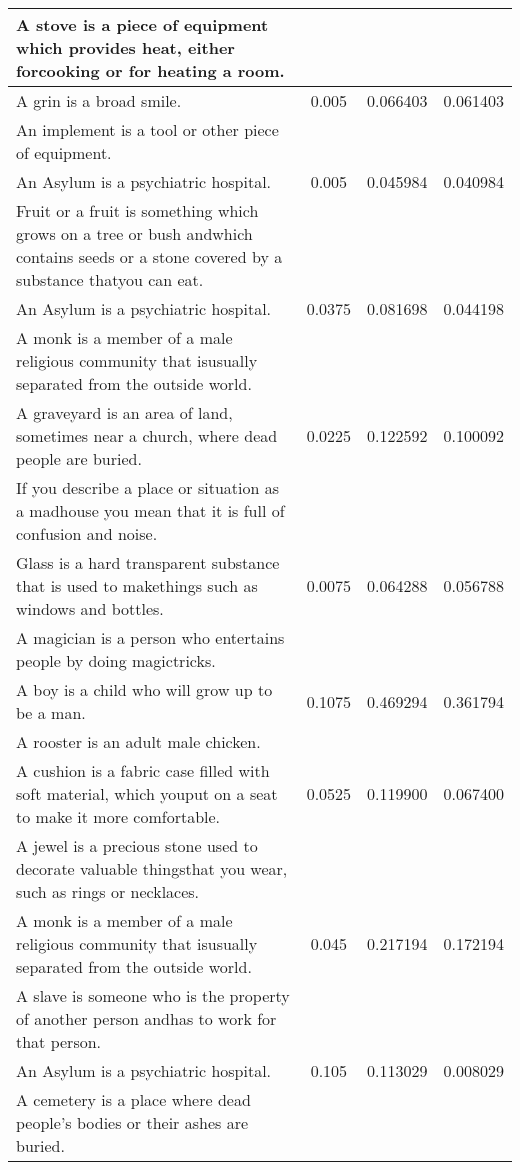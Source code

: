 \begin{table}[p]
\begin{center}
{\begin{tabular}{|p{9cm}|c|c|c|}
A stove is a piece of equipment which provides heat, either forcooking or for heating a room. & & & \\
\hline
A grin is a broad smile. & 0.005 & 0.066403 & 0.061403 \\
An implement is a tool or other piece of equipment. & & & \\
\hline
An Asylum is a psychiatric hospital. & 0.005 & 0.045984 & 0.040984 \\
Fruit or a fruit is something which grows on a tree or bush andwhich contains seeds or a stone covered by a substance thatyou can eat. & & & \\
\hline
An Asylum is a psychiatric hospital. & 0.0375 & 0.081698 & 0.044198 \\
A monk is a member of a male religious community that isusually separated from the outside world. & & & \\
\hline
A graveyard is an area of land, sometimes near a church, where dead people are buried. & 0.0225 & 0.122592 & 0.100092 \\
If you describe a place or situation as a madhouse you mean                                                                             that it is full of confusion and noise. & & & \\
\hline
Glass is a hard transparent substance that is used to makethings such as windows and bottles. & 0.0075 & 0.064288 & 0.056788 \\
A magician is a person who entertains people by doing magictricks. & & & \\
\hline
A boy is a child who will grow up to be a man. & 0.1075 & 0.469294 & 0.361794 \\
A rooster is an adult male chicken. & & & \\
\hline
A cushion is a fabric case filled with soft material, which youput on a seat to make it more comfortable. & 0.0525 & 0.119900 & 0.067400 \\
A jewel is a precious stone used to decorate valuable thingsthat you wear, such as rings or necklaces. & & & \\
\hline
A monk is a member of a male religious community that isusually separated from the outside world. & 0.045 & 0.217194 & 0.172194 \\
A slave is someone who is the property of another person andhas to work for that person. & & & \\
\hline
An Asylum is a psychiatric hospital. & 0.105 & 0.113029 & 0.008029 \\
A cemetery is a place where dead people's bodies or their ashes are buried. & & & \\

\end{tabular}}
\end{center}
\end{table}
